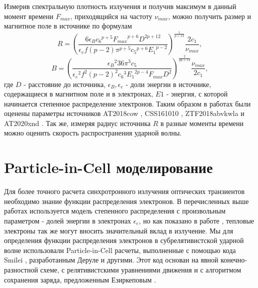 Измерив спектральную плотность излучения и получив максимум в данный момент времени $F_{max}$, приходящийся на частоту $\nu_{max}$, можно получить размер и магнитное поле в источнике по формулам
\begin{equation}\label{ChevR}
R = {\left( \frac {6 \epsilon_B {c_6}^{p+5}{F_{max}}^{p+6}{
			D}^{2p+12}}{\epsilon_e f \left( p-2 \right) {\pi}^{p+5}{{c_5}}^{p+6}
		{E_1}^{p-2}} \right)} ^{ \frac{1}{p+13} } \frac{2 c_1}{\nu_{max}},
\end{equation}
\begin{equation}\label{ChevB}
B = { \left(\frac {{\epsilon_B}^2 36 {\pi}^{3}{c_5}}{{
			\epsilon_e}^{2}{f}^{2} \left( p-2 \right) ^{2}{{c_6}}^{3}{{E_1}}^{2 p-4}F_{max}{D}^{2}} \right)}
^{\frac{2}{2p+13}}\frac{\nu_{max}}{2 c_1},
\end{equation}
где $D$ - расстояние до источника, $\epsilon_B, \epsilon_e$ - доли энергии в источнике, содержащиеся в магнитном поле и в электронах, $E1$ - энергия, с которой начинается степенное распределение электронов. Таким образом в работах  были оценены параметры источников AT2018cow \cite{Margutti2014}, CSS161010 \cite{Coppejans2020}, ZTF2018abvkwla \cite{Ho2020} и AT2020xnd \cite{Ho2021, Bright2021}. Так же, измеряя радиус источника $R$ в разные моменты времени можно оценить скорость распространения ударной волны.
\section{Particle-in-Cell моделирование }
Для более точного расчета синхротронного излучения оптических транзиентов необходимо знание функции распределения электронов. В перечисленных выше работах используется модель степенного распределения с произвольным параметром - долей энергии в электронах $\epsilon_e$, но как показано в работе \cite{Margalit2021}, тепловые электроны так же могут вносить значительный вклад в излучение. Мы для определения функции распределения электронов в субрелятивистской ударной волне использовали Particle-in-Cell расчеты, выполненные с помощью кода Smilei \cite{Smilei18}, разработанным Деруле и другими. Этот код основан на явной конечно-разностной схеме, с релятивистскими уравнениями движения и с алгоритмом сохранения заряда, предложенным Езиркеповым \cite{Esirkepov}.

